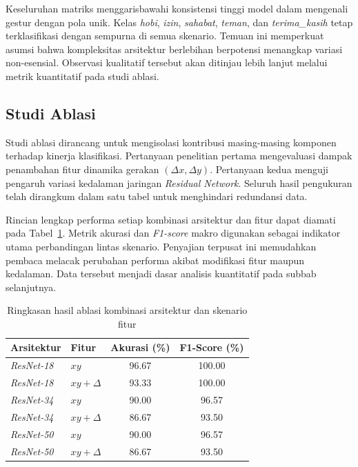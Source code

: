 Keseluruhan matriks menggarisbawahi konsistensi tinggi model dalam mengenali gestur dengan pola unik.
Kelas \textit{hobi}, \textit{izin}, \textit{sahabat}, \textit{teman}, dan \textit{terima\_kasih} tetap terklasifikasi dengan sempurna di semua skenario.
Temuan ini memperkuat asumsi bahwa kompleksitas arsitektur berlebihan berpotensi menangkap variasi non-esensial.
Observasi kualitatif tersebut akan ditinjau lebih lanjut melalui metrik kuantitatif pada studi ablasi.

\subsection{Studi Ablasi}
\label{subsec:studi-ablasi}
Studi ablasi dirancang untuk mengisolasi kontribusi masing-masing komponen terhadap kinerja klasifikasi.
Pertanyaan penelitian pertama mengevaluasi dampak penambahan fitur dinamika gerakan $(\Delta x, \Delta y)$.
Pertanyaan kedua menguji pengaruh variasi kedalaman jaringan \textit{Residual Network}.
Seluruh hasil pengukuran telah dirangkum dalam satu tabel untuk menghindari redundansi data.

Rincian lengkap performa setiap kombinasi arsitektur dan fitur dapat diamati pada Tabel~\ref{tab:ablasi-komprehensif}.
Metrik akurasi dan \textit{F1-score} makro digunakan sebagai indikator utama perbandingan lintas skenario.
Penyajian terpusat ini memudahkan pembaca melacak perubahan performa akibat modifikasi fitur maupun kedalaman.
Data tersebut menjadi dasar analisis kuantitatif pada subbab selanjutnya.
\begin{table}[H]
  \centering
  \caption{Ringkasan hasil ablasi kombinasi arsitektur dan skenario fitur}
  \label{tab:ablasi-komprehensif}
  \begin{tabular}{|l|l|c|c|}
  \hline
  \textbf{Arsitektur} & \textbf{Fitur} & \textbf{Akurasi (\%)} & \textbf{F1-Score (\%)} \\ \hline
  \textit{ResNet-18} & $xy$ & 96.67 & 100.00 \\ \hline
  \textit{ResNet-18} & $xy + \Delta$ & 93.33 & 100.00 \\ \hline
  \textit{ResNet-34} & $xy$ & 90.00 & 96.57 \\ \hline
  \textit{ResNet-34} & $xy + \Delta$ & 86.67 & 93.50 \\ \hline
  \textit{ResNet-50} & $xy$ & 90.00 & 96.57 \\ \hline
  \textit{ResNet-50} & $xy + \Delta$ & 86.67 & 93.50 \\ \hline
  \end{tabular}
\end{table}

